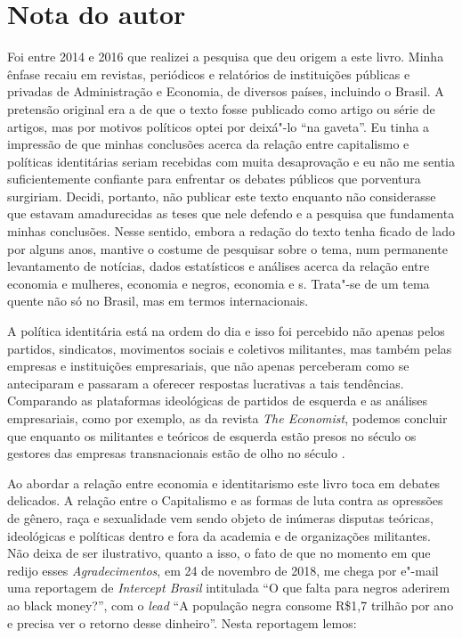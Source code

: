 \chapter{Nota do autor}

Foi entre 2014 e 2016 que realizei a pesquisa que deu origem a este
livro. Minha ênfase recaiu em revistas, periódicos e relatórios de
instituições públicas e privadas de Administração e Economia, de
diversos países, incluindo o Brasil. A pretensão original era a de que o
texto fosse publicado como artigo ou série de artigos, mas por motivos
políticos optei por deixá"-lo ``na gaveta''. Eu tinha a impressão de que
minhas conclusões acerca da relação entre capitalismo e políticas
identitárias seriam recebidas com muita desaprovação e eu não me sentia
suficientemente confiante para enfrentar os debates públicos que
porventura surgiriam. Decidi, portanto, não publicar este texto enquanto
não considerasse que estavam amadurecidas as teses que nele defendo e a
pesquisa que fundamenta minhas conclusões. Nesse sentido, embora a
redação do texto tenha ficado de lado por alguns anos, mantive o costume
de pesquisar sobre o tema, num permanente levantamento de notícias,
dados estatísticos e análises acerca da relação entre economia e
mulheres, economia e negros, economia e s. Trata"-se de um tema
quente não só no Brasil, mas em termos internacionais.

A política identitária está na ordem do dia e isso foi percebido não
apenas pelos partidos, sindicatos, movimentos sociais e coletivos
militantes, mas também pelas empresas e instituições empresariais, que
não apenas perceberam como se anteciparam e passaram a oferecer
respostas lucrativas a tais tendências. Comparando as plataformas
ideológicas de partidos de esquerda e as análises empresariais, como por
exemplo, as da revista \emph{The Economist}, podemos concluir que
enquanto os militantes e teóricos de esquerda estão presos no século 
os gestores das empresas transnacionais estão de olho no século .

Ao abordar a relação entre economia e identitarismo este livro toca em
debates delicados. A relação entre o Capitalismo e as formas de luta
contra as opressões de gênero, raça e sexualidade vem sendo objeto de
inúmeras disputas teóricas, ideológicas e políticas dentro e fora da
academia e de organizações militantes. Não deixa de ser ilustrativo,
quanto a isso, o fato de que no momento em que redijo esses
\emph{Agradecimentos}, em 24 de novembro de 2018, me chega por e"-mail
uma reportagem de \emph{Intercept Brasil} intitulada ``O que falta para
negros aderirem ao black money?'', com o \emph{lead} ``A população negra
consome R\$1,7 trilhão por ano e precisa ver o retorno desse dinheiro''.
Nesta reportagem lemos:

